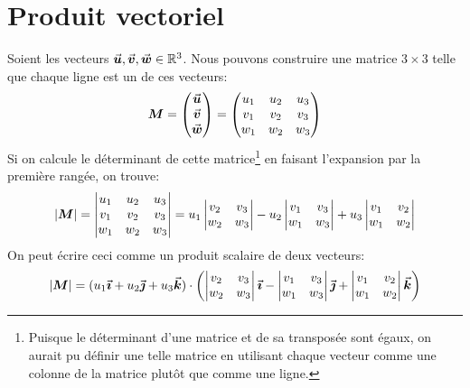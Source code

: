 \section{Produit vectoriel}
Soient les vecteurs $\vec{\boldsymbol{u}}, \vec{\boldsymbol{v}}, \vec{\boldsymbol{w}} \in\mathbb{R}^3$.  Nous pouvons construire une matrice $3\times 3$ telle que chaque ligne est un de ces vecteurs:
\[
\boldsymbol{M} = \begin{pmatrix}
\vec{\boldsymbol{u}}\\
\vec{\boldsymbol{v}}\\
 \vec{\boldsymbol{w}}
\end{pmatrix}
= \begin{pmatrix}
u_1 & u_2 & u_3 \\
v_1 & v_2 & v_3 \\
w_1 & w_2 & w_3 
\end{pmatrix}
\]
Si on calcule le déterminant de cette matrice\footnote{Puisque le déterminant d'une matrice
et de sa transposée sont égaux, on aurait pu définir une telle matrice en utilisant chaque
vecteur comme une colonne de la matrice plutôt que comme une ligne.}
 en faisant l'expansion par la première rangée, on trouve:
\[
|\boldsymbol{M}| = \begin{vmatrix}
u_1 & u_2 & u_3 \\
v_1 & v_2 & v_3 \\
w_1 & w_2 & w_3
\end{vmatrix}
= u_1 \begin{vmatrix}
v_2 & v_3 \\
w_2 & w_3
\end{vmatrix}
-
u_2 \begin{vmatrix}
v_1 & v_3 \\
w_1 & w_3
\end{vmatrix}
+
u_3 \begin{vmatrix}
v_1 & v_2 \\
w_1 & w_2
\end{vmatrix}
\]
On peut écrire ceci comme un produit scalaire de deux vecteurs:
\[
|\boldsymbol{M}| =(u_1\vec{\boldsymbol{\imath}} + u_2\vec{\boldsymbol{\jmath}}+u_3\vec{\boldsymbol{k}}) \cdot
\left( \begin{vmatrix}
v_2 & v_3 \\
w_2 & w_3
\end{vmatrix} \vec{\boldsymbol{\imath}}
-
\begin{vmatrix}
v_1 & v_3 \\
w_1 & w_3
\end{vmatrix}\vec{\boldsymbol{\jmath}}
+
 \begin{vmatrix}
v_1 & v_2 \\
w_1 & w_2
\end{vmatrix}\vec{\boldsymbol{k}}\right)
\]
